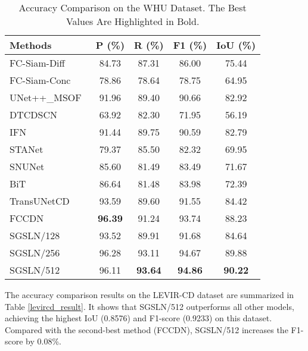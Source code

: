 \documentclass[journal]{IEEEtran}
\begin{document}
\begin{table}[!ht]
\caption{Accuracy Comparison on the WHU Dataset. The Best Values Are Highlighted in Bold.}
\label{whu_result}
\centering
\begin{tabular}{lcccc}
\toprule
Methods & P (\%) & R (\%) & F1 (\%) & IoU (\%) \\
\midrule
FC-Siam-Diff~\cite{fcef} & 84.73 & 87.31 & 86.00 & 75.44 \\
FC-Siam-Conc~\cite{fcef} & 78.86 & 78.64 & 78.75 & 64.95\\ 
UNet++\_MSOF~\cite{etecd} & 91.96 & 89.40 & 90.66 & 82.92 \\
DTCDSCN~\cite{dtcdstn} & 63.92 & 82.30 & 71.95 & 56.19 \\
IFN~\cite{dsifn} & 91.44 & 89.75 & 90.59 & 82.79 \\
STANet~\cite{sta} & 79.37 & 85.50 & 82.32 & 69.95 \\
SNUNet~\cite{snu} & 85.60 & 81.49 & 83.49 & 71.67 \\
BiT~\cite{bit} & 86.64 & 81.48 & 83.98 & 72.39 \\
TransUNetCD~\cite{transunetcd} & 93.59 & 89.60 & 91.55 & 84.42 \\
FCCDN~\cite{fccdn} & \textbf{96.39} & 91.24 & 93.74 & 88.23 \\
SGSLN/128 & 93.52 & 89.91 & 91.68 & 84.64 \\
SGSLN/256 & 96.28 & 93.11 & 94.67 & 89.88 \\
SGSLN/512 & 96.11 & \textbf{93.64} & \textbf{94.86} & \textbf{90.22} \\
\bottomrule
\end{tabular}
\end{table}

The accuracy comparison results on the LEVIR-CD dataset are summarized in Table \ref{levircd_result}. It shows that SGSLN/512 outperforms all other models, achieving the highest IoU (0.8576) and F1-score (0.9233) on this dataset. Compared with the second-best method (FCCDN), SGSLN/512 increases the F1-score by 0.08\%.
\end{document}
